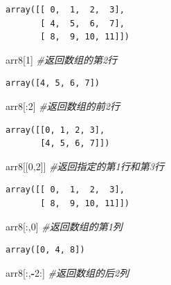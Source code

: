\documentclass[]{article}
\newenvironment{Shaded}{\begin{snugshade}}{\end{snugshade}}
\newcommand{\DecValTok}[1]{\textcolor[rgb]{0.00,0.00,0.81}{#1}}
\newcommand{\CommentTok}[1]{\textcolor[rgb]{0.56,0.35,0.01}{\textit{#1}}}
\newcommand{\OperatorTok}[1]{\textcolor[rgb]{0.81,0.36,0.00}{\textbf{#1}}}
\newcommand{\NormalTok}[1]{#1}
\begin{document}
\begin{verbatim}
array([[ 0,  1,  2,  3],
       [ 4,  5,  6,  7],
       [ 8,  9, 10, 11]])
\end{verbatim}

\begin{Shaded}
\begin{Highlighting}[]
\NormalTok{arr8[}\DecValTok{1}\NormalTok{] }\CommentTok{#返回数组的第2行}
\end{Highlighting}
\end{Shaded}

\begin{verbatim}
array([4, 5, 6, 7])
\end{verbatim}

\begin{Shaded}
\begin{Highlighting}[]
\NormalTok{arr8[:}\DecValTok{2}\NormalTok{] }\CommentTok{#返回数组的前2行}
\end{Highlighting}
\end{Shaded}

\begin{verbatim}
array([[0, 1, 2, 3],
       [4, 5, 6, 7]])
\end{verbatim}

\begin{Shaded}
\begin{Highlighting}[]
\NormalTok{arr8[[}\DecValTok{0}\NormalTok{,}\DecValTok{2}\NormalTok{]] }\CommentTok{#返回指定的第1行和第3行}
\end{Highlighting}
\end{Shaded}

\begin{verbatim}
array([[ 0,  1,  2,  3],
       [ 8,  9, 10, 11]])
\end{verbatim}

\begin{Shaded}
\begin{Highlighting}[]
\NormalTok{arr8[:,}\DecValTok{0}\NormalTok{] }\CommentTok{#返回数组的第1列}
\end{Highlighting}
\end{Shaded}

\begin{verbatim}
array([0, 4, 8])
\end{verbatim}

\begin{Shaded}
\begin{Highlighting}[]
\NormalTok{arr8[:,}\OperatorTok{-}\DecValTok{2}\NormalTok{:] }\CommentTok{#返回数组的后2列}
\end{Highlighting}
\end{Shaded}
\end{document}
